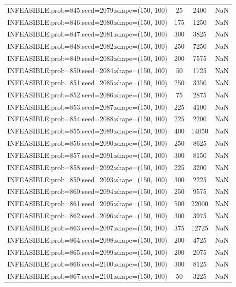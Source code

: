 \begin{longtable}{lccc}
INFEASIBLE:prob=845:seed=2079:shape=(150, 100) &       25 &  2400 &    NaN \\
INFEASIBLE:prob=846:seed=2080:shape=(150, 100) &      175 &  1250 &    NaN \\
INFEASIBLE:prob=847:seed=2081:shape=(150, 100) &      300 &  3825 &    NaN \\
INFEASIBLE:prob=848:seed=2082:shape=(150, 100) &      250 &  7250 &    NaN \\
INFEASIBLE:prob=849:seed=2083:shape=(150, 100) &      200 &  7575 &    NaN \\
INFEASIBLE:prob=850:seed=2084:shape=(150, 100) &       50 &  1725 &    NaN \\
INFEASIBLE:prob=851:seed=2085:shape=(150, 100) &      250 &  3350 &    NaN \\
INFEASIBLE:prob=852:seed=2086:shape=(150, 100) &       75 &  2875 &    NaN \\
INFEASIBLE:prob=853:seed=2087:shape=(150, 100) &      225 &  4100 &    NaN \\
INFEASIBLE:prob=854:seed=2088:shape=(150, 100) &      225 &  2200 &    NaN \\
INFEASIBLE:prob=855:seed=2089:shape=(150, 100) &      400 & 14050 &    NaN \\
INFEASIBLE:prob=856:seed=2090:shape=(150, 100) &      250 &  8625 &    NaN \\
INFEASIBLE:prob=857:seed=2091:shape=(150, 100) &      300 &  8150 &    NaN \\
INFEASIBLE:prob=858:seed=2092:shape=(150, 100) &      225 &  3200 &    NaN \\
INFEASIBLE:prob=859:seed=2093:shape=(150, 100) &      300 &  2225 &    NaN \\
INFEASIBLE:prob=860:seed=2094:shape=(150, 100) &      250 &  9575 &    NaN \\
INFEASIBLE:prob=861:seed=2095:shape=(150, 100) &      500 & 22000 &    NaN \\
INFEASIBLE:prob=862:seed=2096:shape=(150, 100) &      300 &  3975 &    NaN \\
INFEASIBLE:prob=863:seed=2097:shape=(150, 100) &      375 & 12725 &    NaN \\
INFEASIBLE:prob=864:seed=2098:shape=(150, 100) &      200 &  4725 &    NaN \\
INFEASIBLE:prob=865:seed=2099:shape=(150, 100) &      200 &  2075 &    NaN \\
INFEASIBLE:prob=866:seed=2100:shape=(150, 100) &      300 &  8125 &    NaN \\
INFEASIBLE:prob=867:seed=2101:shape=(150, 100) &       50 &  3225 &    NaN \\

\end{longtable}
